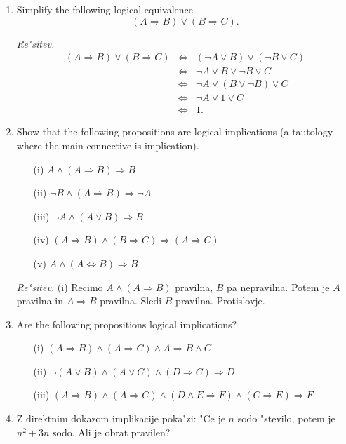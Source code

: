 \documentclass[11pt,paper=b5,footinclude,headinclude]{scrbook} %
\begin{document}
\begin{enumerate}
\item Simplify the following logical equivalence
$$(A\Rightarrow B) \vee (B \Rightarrow C).$$

\emph{Re"sitev.} 
\begin{eqnarray*}
(A\Rightarrow B) \vee (B \Rightarrow C) &\Leftrightarrow & (\neg A \vee B) \vee (\neg B \vee C)\\
&\Leftrightarrow & \neg A \vee B \vee \neg B \vee C\\
&\Leftrightarrow & \neg A \vee (B \vee \neg B) \vee C\\
&\Leftrightarrow & \neg A \vee 1 \vee C\\
&\Leftrightarrow & 1.
\end{eqnarray*}

\item Show that the following propositions are logical implications (a tautology where the main connective is implication).
\begin{enumerate}
\item[(i)] $A \wedge (A \Rightarrow B) \Rightarrow B$
\item[(ii)] $\neg B \wedge (A \Rightarrow B) \Rightarrow \neg A$
\item[(iii)] $\neg A \wedge (A \vee B) \Rightarrow B$
\item[(iv)] $(A \Rightarrow B) \wedge (B \Rightarrow C) \Rightarrow (A \Rightarrow C)$
\item[(v)] $A \wedge (A \Leftrightarrow B) \Rightarrow B$
\end{enumerate}

\emph{Re"sitev.} (i) Recimo $A \wedge (A \Rightarrow B)$ pravilna, $B$ pa nepravilna. Potem je $A$ pravilna in $A\Rightarrow B$ pravilna. Sledi $B$ pravilna. Protislovje. 


\item Are the following propositions logical implications?
\begin{enumerate}
\item[(i)] $(A \Rightarrow B ) \wedge (A \Rightarrow C) \wedge A \Rightarrow B \wedge C$
\item[(ii)] $\neg (A \vee B) \wedge (A\vee C) \wedge (D\Rightarrow C) \Rightarrow D$
\item[(iii)] $(A\Rightarrow B) \wedge (A\Rightarrow C) \wedge (D\wedge E \Rightarrow F) \wedge (C\Rightarrow E) \Rightarrow F$
\end{enumerate}

\item Z direktnim dokazom implikacije poka"zi: "Ce je $n$ sodo "stevilo, potem je $n^2 +3n$ sodo. Ali je obrat pravilen? 


\end{enumerate}
\end{document}
